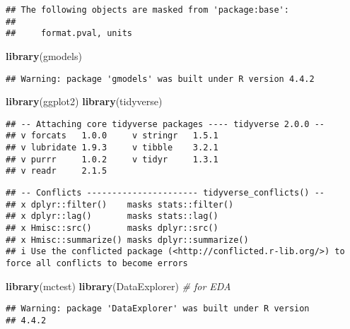 \documentclass[
]{article}
\newenvironment{Shaded}{\begin{snugshade}}{\end{snugshade}}
\newcommand{\CommentTok}[1]{\textcolor[rgb]{0.56,0.35,0.01}{\textit{#1}}}
\newcommand{\FunctionTok}[1]{\textcolor[rgb]{0.13,0.29,0.53}{\textbf{#1}}}
\newcommand{\NormalTok}[1]{#1}
\begin{document}
\begin{verbatim}
## The following objects are masked from 'package:base':
## 
##     format.pval, units
\end{verbatim}

\begin{Shaded}
\begin{Highlighting}[]
\FunctionTok{library}\NormalTok{(gmodels)}
\end{Highlighting}
\end{Shaded}

\begin{verbatim}
## Warning: package 'gmodels' was built under R version 4.4.2
\end{verbatim}

\begin{Shaded}
\begin{Highlighting}[]
\FunctionTok{library}\NormalTok{(ggplot2)}
\FunctionTok{library}\NormalTok{(tidyverse)}
\end{Highlighting}
\end{Shaded}

\begin{verbatim}
## -- Attaching core tidyverse packages ---- tidyverse 2.0.0 --
## v forcats   1.0.0     v stringr   1.5.1
## v lubridate 1.9.3     v tibble    3.2.1
## v purrr     1.0.2     v tidyr     1.3.1
## v readr     2.1.5
\end{verbatim}

\begin{verbatim}
## -- Conflicts ---------------------- tidyverse_conflicts() --
## x dplyr::filter()    masks stats::filter()
## x dplyr::lag()       masks stats::lag()
## x Hmisc::src()       masks dplyr::src()
## x Hmisc::summarize() masks dplyr::summarize()
## i Use the conflicted package (<http://conflicted.r-lib.org/>) to force all conflicts to become errors
\end{verbatim}

\begin{Shaded}
\begin{Highlighting}[]
\FunctionTok{library}\NormalTok{(mctest)}
\FunctionTok{library}\NormalTok{(DataExplorer) }\CommentTok{\# for EDA}
\end{Highlighting}
\end{Shaded}

\begin{verbatim}
## Warning: package 'DataExplorer' was built under R version
## 4.4.2
\end{verbatim}
\end{document}
